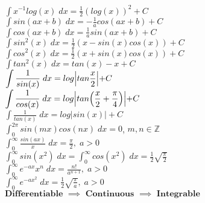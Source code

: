 \documentclass[]{article}
\newcommand{\mathlarger}[1]{\displaystyle#1}
\begin{document}
\begin{multicols*}{3}
$\mathlarger{\int x^{-1}log(x)\;dx= \frac{1}{2}(log(x))^2 + C}$\\
$\mathlarger{\int sin(ax+b)\;dx=-\frac{1}{a}cos(ax+b)+C}$\\
$\mathlarger{\int cos(ax+b)\;dx=\frac{1}{a}sin(ax+b)+C}$\\
$\mathlarger{\int sin^2(x)\;dx= \frac{1}{2}(x-sin(x)cos(x))+C}$\\
$\mathlarger{\int cos^2(x)\;dx= \frac{1}{2}(x+sin(x)cos(x))+C}$\\
$\mathlarger{\int tan^2(x)\;dx= tan(x)-x+C}$\\
$\mathlarger{\int \frac{1}{sin(x)}\;dx=log\Bigl|tan\frac{x}{2}\Bigl|+C}$\\
$\mathlarger{\int \frac{1}{cos(x)}\;dx=log\Bigl|tan\Bigl(\frac{x}{2}+\frac{\pi}{4}\Bigl)\Bigl|+C}$\\
$\mathlarger{\int \frac{1}{tan(x)}\;dx=log|sin(x)|+C}$\\

$\mathlarger{\int_0^{2\pi} sin(mx)cos(nx)\;dx=0}$, $m,n\in \mathbb{Z}$\\
$\mathlarger{\int_0^\infty \frac{sin(ax)}{x}\;dx=\frac{\pi}{2},\;a>0}$\\
$\mathlarger{\int_0^\infty sin(x^2)\;dx=\int_0^\infty cos(x^2)\;dx=\frac{1}{2}\sqrt{\frac{\pi}{2}}}$\\
$\mathlarger{\int_0^\infty e^{-ax}x^n\;dx= \frac{n!}{a^{n+1}},\;a>0}$\\
$\mathlarger{\int_0^\infty e^{-ax^2}\;dx=\frac{1}{2}\sqrt{\frac{\pi}{a}},\;a>0}$\\

$\textbf{Differentiable }\implies\textbf{ Continuous }\implies \textbf{ Integrable}$


\end{multicols*}
\end{document}
